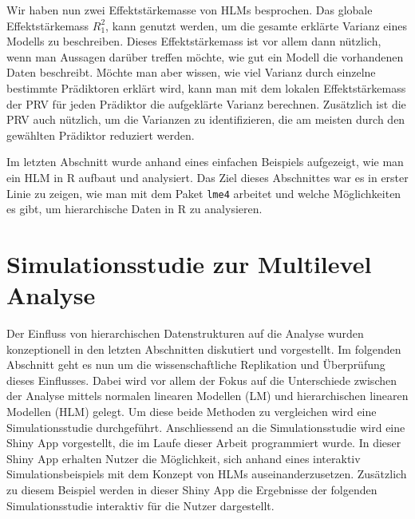 \documentclass[12pt, a4paper]{article}\usepackage[]{graphicx}\usepackage[]{color}
\begin{document}
Wir haben nun zwei Effektstärkemasse von HLMs besprochen. Das globale Effektstärkemass $R_{1}^2$, kann genutzt werden, um die gesamte erklärte Varianz eines Modells zu beschreiben. Dieses Effektstärkemass ist vor allem dann nützlich, wenn man Aussagen darüber treffen möchte, wie gut ein Modell die vorhandenen Daten beschreibt. Möchte man aber wissen, wie viel Varianz durch einzelne bestimmte Prädiktoren erklärt wird, kann man mit dem lokalen Effektstärkemass der PRV für jeden Prädiktor die aufgeklärte Varianz berechnen. Zusätzlich ist die PRV auch nützlich, um die Varianzen zu identifizieren, die am meisten durch den gewählten Prädiktor reduziert werden.

Im letzten Abschnitt wurde anhand eines einfachen Beispiels aufgezeigt, wie man ein HLM in R aufbaut und analysiert. Das Ziel dieses Abschnittes war es in erster Linie zu zeigen, wie man mit dem Paket \texttt{lme4} arbeitet und welche Möglichkeiten es gibt, um hierarchische Daten in R zu analysieren.

\section{Simulationsstudie zur Multilevel Analyse}
Der Einfluss von hierarchischen Datenstrukturen auf die Analyse wurden konzeptionell in den letzten Abschnitten diskutiert und vorgestellt. Im folgenden Abschnitt geht es nun um die wissenschaftliche Replikation und Überprüfung dieses Einflusses. Dabei wird vor allem der Fokus auf die Unterschiede zwischen der Analyse mittels normalen linearen Modellen (LM) und hierarchischen linearen Modellen (HLM) gelegt. Um diese beide Methoden zu vergleichen wird eine Simulationsstudie durchgeführt. Anschliessend an die Simulationsstudie wird eine Shiny App \citep{shiny} vorgestellt, die im Laufe dieser Arbeit programmiert wurde. In dieser Shiny App erhalten Nutzer die Möglichkeit, sich anhand eines interaktiv Simulationsbeispiels mit dem Konzept von HLMs auseinanderzusetzen. Zusätzlich zu diesem Beispiel werden in dieser Shiny App die Ergebnisse der folgenden Simulationsstudie interaktiv für die Nutzer dargestellt.
\end{document}
